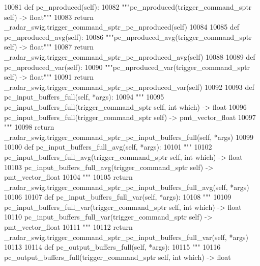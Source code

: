 \begin{DoxyCode}
{{{{{{{{{{{{{{{{{{{{{{{{{{{{{{{{10081     \textcolor{keyword}{def }pc_nproduced(self):
10082         \textcolor{stringliteral}{"""pc\_nproduced(trigger\_command\_sptr self) -> float"""}
10083         \textcolor{keywordflow}{return} \_radar\_swig.trigger\_command\_sptr\_pc\_nproduced(self)
10084 
10085     \textcolor{keyword}{def }pc_nproduced_avg(self):
10086         \textcolor{stringliteral}{"""pc\_nproduced\_avg(trigger\_command\_sptr self) -> float"""}
10087         \textcolor{keywordflow}{return} \_radar\_swig.trigger\_command\_sptr\_pc\_nproduced\_avg(self)
10088 
10089     \textcolor{keyword}{def }pc_nproduced_var(self):
10090         \textcolor{stringliteral}{"""pc\_nproduced\_var(trigger\_command\_sptr self) -> float"""}
10091         \textcolor{keywordflow}{return} \_radar\_swig.trigger\_command\_sptr\_pc\_nproduced\_var(self)
10092 
10093     \textcolor{keyword}{def }pc_input_buffers_full(self, *args):
10094         \textcolor{stringliteral}{"""}
10095 \textcolor{stringliteral}{        pc\_input\_buffers\_full(trigger\_command\_sptr self, int which) -> float}
10096 \textcolor{stringliteral}{        pc\_input\_buffers\_full(trigger\_command\_sptr self) -> pmt\_vector\_float}
10097 \textcolor{stringliteral}{        """}
10098         \textcolor{keywordflow}{return} \_radar\_swig.trigger\_command\_sptr\_pc\_input\_buffers\_full(self, *args)
10099 
10100     \textcolor{keyword}{def }pc_input_buffers_full_avg(self, *args):
10101         \textcolor{stringliteral}{"""}
10102 \textcolor{stringliteral}{        pc\_input\_buffers\_full\_avg(trigger\_command\_sptr self, int which) -> float}
10103 \textcolor{stringliteral}{        pc\_input\_buffers\_full\_avg(trigger\_command\_sptr self) -> pmt\_vector\_float}
10104 \textcolor{stringliteral}{        """}
10105         \textcolor{keywordflow}{return} \_radar\_swig.trigger\_command\_sptr\_pc\_input\_buffers\_full\_avg(self, *args)
10106 
10107     \textcolor{keyword}{def }pc_input_buffers_full_var(self, *args):
10108         \textcolor{stringliteral}{"""}
10109 \textcolor{stringliteral}{        pc\_input\_buffers\_full\_var(trigger\_command\_sptr self, int which) -> float}
10110 \textcolor{stringliteral}{        pc\_input\_buffers\_full\_var(trigger\_command\_sptr self) -> pmt\_vector\_float}
10111 \textcolor{stringliteral}{        """}
10112         \textcolor{keywordflow}{return} \_radar\_swig.trigger\_command\_sptr\_pc\_input\_buffers\_full\_var(self, *args)
10113 
10114     \textcolor{keyword}{def }pc_output_buffers_full(self, *args):
10115         \textcolor{stringliteral}{"""}
10116 \textcolor{stringliteral}{        pc\_output\_buffers\_full(trigger\_command\_sptr self, int which) -> float}
}}}}}}}}}}}}}}}}}}}}}}}}}}}}}}}}
\end{DoxyCode}
